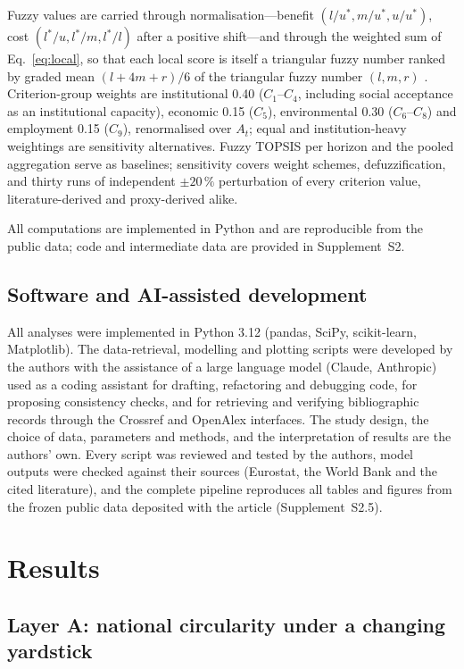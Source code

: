 \documentclass[a4paper,fleqn]{cas-sc}
\begin{document}


Fuzzy values are carried through normalisation---benefit $(l/u^\ast,m/u^\ast,u/u^\ast)$, cost $(l^\ast/u,l^\ast/m,l^\ast/l)$ after a positive shift---and through the weighted sum of Eq.~\eqref{eq:local}, so that each local score is itself a triangular fuzzy number ranked by graded mean $(l+4m+r)/6$ of the triangular fuzzy number $(l,m,r)$ \citep{chen1999graded}. Criterion-group weights are institutional 0.40 ($C_1$--$C_4$, including social acceptance as an institutional capacity), economic 0.15 ($C_5$), environmental 0.30 ($C_6$--$C_8$) and employment 0.15 ($C_9$), renormalised over $A_t$; equal and institution-heavy weightings are sensitivity alternatives. Fuzzy TOPSIS \citep{chen2000topsis} per horizon and the pooled aggregation serve as baselines; sensitivity covers weight schemes, defuzzification, and thirty runs of independent $\pm20\,\%$ perturbation of every criterion value, literature-derived and proxy-derived alike.

All computations are implemented in Python and are reproducible from the public data; code and intermediate data are provided in Supplement~S2.

\subsection{Software and AI-assisted development}\label{sec:software}
All analyses were implemented in Python 3.12 (pandas, SciPy, scikit-learn, Matplotlib). The data-retrieval, modelling and plotting scripts were developed by the authors with the assistance of a large language model (Claude, Anthropic) used as a coding assistant for drafting, refactoring and debugging code, for proposing consistency checks, and for retrieving and verifying bibliographic records through the Crossref and OpenAlex interfaces. The study design, the choice of data, parameters and methods, and the interpretation of results are the authors' own. Every script was reviewed and tested by the authors, model outputs were checked against their sources (Eurostat, the World Bank and the cited literature), and the complete pipeline reproduces all tables and figures from the frozen public data deposited with the article (Supplement~S2.5).

\section{Results}\label{sec:results}

\subsection{Layer A: national circularity under a changing yardstick}\label{sec:resA}
\end{document}
